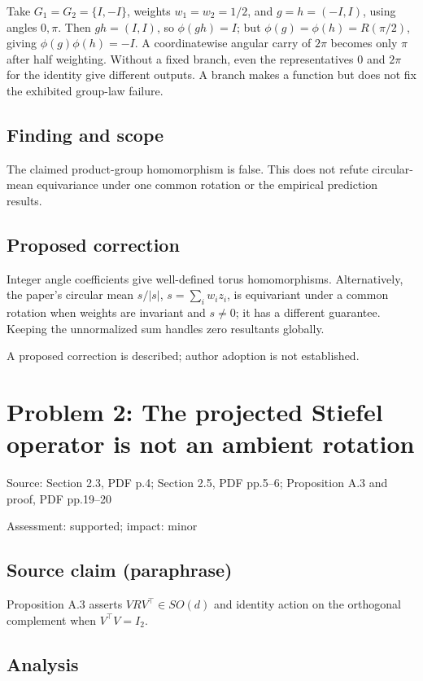 \documentclass[11pt]{article}
\begin{document}
Take \(G_1=G_2=\{I,-I\}\), weights \(w_1=w_2=1/2\), and \(g=h=(-I,I)\), using angles \(0,\pi\). Then \(gh=(I,I)\), so \(\phi(gh)=I\); but \(\phi(g)=\phi(h)=R(\pi/2)\), giving \(\phi(g)\phi(h)=-I\). A coordinatewise angular carry of \(2\pi\) becomes only \(\pi\) after half weighting. Without a fixed branch, even the representatives \(0\) and \(2\pi\) for the identity give different outputs. A branch makes a function but does not fix the exhibited group-law failure.

\subsection*{Finding and scope}

The claimed product-group homomorphism is false. This does not refute circular-mean equivariance under one common rotation or the empirical prediction results.

\subsection*{Proposed correction}

Integer angle coefficients give well-defined torus homomorphisms. Alternatively, the paper’s circular mean \(s/|s|\), \(s=\sum_iw_iz_i\), is equivariant under a common rotation when weights are invariant and \(s\ne0\); it has a different guarantee. Keeping the unnormalized sum handles zero resultants globally.

A proposed correction is described; author adoption is not established.

\section*{Problem 2: The projected Stiefel operator is not an ambient rotation}

Source: Section 2.3, PDF p.4; Section 2.5, PDF pp.5–6; Proposition A.3 and proof, PDF pp.19–20

Assessment: supported; impact: minor

\subsection*{Source claim (paraphrase)}

Proposition A.3 asserts \(VRV^\top\in SO(d)\) and identity action on the orthogonal complement when \(V^\top V=I_2\).

\subsection*{Analysis}
\end{document}

